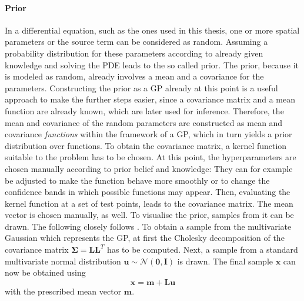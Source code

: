 \documentclass[%
  a4paper,oneside,%
  11pt,%
  smallchapters,
  style=printdev,
  extramargin,
  green,%
  rgb, <cmyk>
  ]{tubsbook}
\begin{document}
\paragraph{Prior}
In a differential equation, such as the ones used in this thesis, one or more spatial parameters or the source term can be considered as random. Assuming a probability distribution for these parameters according to already given knowledge and solving the PDE leads to the so called prior. The prior, because it is modeled as random, already involves a mean and a covariance for the parameters. Constructing the prior as a GP already at this point is a useful approach to make the further steps easier, since a covariance matrix and a mean function are already known, which are later used for inference. Therefore, the mean and covariance of the random parameters are constructed as mean and covariance \emph{functions} within the framework of a GP, which in turn yields a prior distribution over functions. To obtain the covariance matrix, a kernel function suitable to the problem has to be chosen. At this point, the hyperparameters are chosen manually according to prior belief and knowledge: They can for example be adjusted to make the function behave more smoothly or to change the confidence bands in which possible functions may appear. Then, evaluating the kernel function at a set of test points, leads to the covariance matrix. The mean vector is chosen manually, as well.
To visualise the prior, samples from it can be drawn.
The following closely follows \cite[A2]{rasmussen2006}.
To obtain a sample from the multivariate Gaussian which represents the GP, at first the Cholesky decomposition of the covariance matrix $\bm{\Sigma} = \bm{L}\bm{L}^T$ has to be computed. Next, a sample from a standard multivariate normal distribution $\bm{u} \sim \mathcal{N} (\bm{0},\bm{I})$ is drawn. The final sample $\bm{x}$ can now be obtained using
\begin{equation}
\bm{x} = \bm{m} + \bm{L} \bm{u} 
\end{equation}
with the prescribed mean vector $\bm{m}$.

	
	
\end{document}
